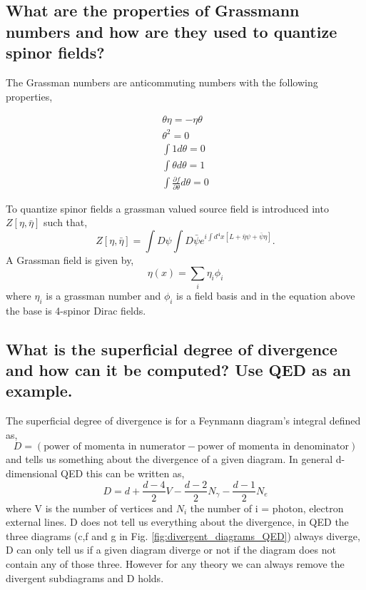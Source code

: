 \documentclass[paper=a4, fontsize=11pt]{scrartcl} %
\numberwithin{equation}{section} %
\numberwithin{figure}{section} %
\numberwithin{table}{section} %
\begin{document}
\subsection{What are the properties of Grassmann numbers and how are they used to
quantize spinor fields?}
The Grassman numbers are anticommuting numbers with the following properties,

\begin{equation}
\begin{split}
\theta \eta = - \eta \theta \\
\theta^2 = 0 \\
\int 1 d\theta = 0 \\
\int \theta d\theta = 1 \\
\int \frac{\partial f}{\partial \theta} d\theta = 0
\end{split}
\end{equation}

To quantize spinor fields a grassman valued source field is introduced into $Z[\eta, \bar{\eta}]$ such that, 
\begin{equation}
Z[\eta, \bar{\eta}] = \int D \psi \int D \bar{\psi} e^{i\int d^4 x [L + \bar{\eta}\psi+ \bar{\psi}\eta ]}.
\end{equation}
A Grassman field is given by,
\begin{equation}
\eta (x) = \sum_i \eta_i \phi_i
\end{equation}
where $\eta_i$ is a grassman number and $\phi_i$ is a field basis and in the equation above the base is 4-spinor Dirac fields. 

\subsection{What is the superficial degree of divergence and how can it be computed?
Use QED as an example.}
The superficial degree of divergence is for a Feynmann diagram's integral defined as,
\begin{equation}
D = (\text{power of momenta in numerator} - \text{power of momenta in denominator})
\end{equation}
and tells us something about the divergence of a given diagram. In general d-dimensional QED this can be written as,
\begin{equation}
D = d + \frac{d-4}{2}V - \frac{d-2}{2}N_{\gamma} - \frac{d-1}{2}N_{e}
\end{equation} 
where V is the number of vertices and $N_i$ the number of i = photon, electron external lines. D does not tell us everything about the divergence, in QED the three diagrams (c,f and g in Fig. \ref{fig:divergent_diagrams_QED}) always diverge, D can only tell us if a given diagram diverge or not if the diagram does not contain any of those three. However for any theory we can always remove the divergent subdiagrams and D holds.
\end{document}
